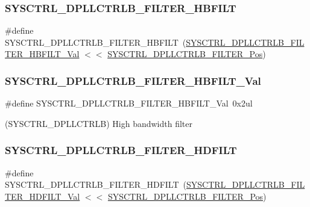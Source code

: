 \subsubsection{\texorpdfstring{SYSCTRL\_DPLLCTRLB\_FILTER\_HBFILT}{SYSCTRL\_DPLLCTRLB\_FILTER\_HBFILT}}
{\footnotesize\ttfamily \#define S\+Y\+S\+C\+T\+R\+L\+\_\+\+D\+P\+L\+L\+C\+T\+R\+L\+B\+\_\+\+F\+I\+L\+T\+E\+R\+\_\+\+H\+B\+F\+I\+LT~(\mbox{\hyperlink{group___s_a_m_d21___s_y_s_c_t_r_l_ga2bf8af18398ded60a70d51412c5aa84b}{S\+Y\+S\+C\+T\+R\+L\+\_\+\+D\+P\+L\+L\+C\+T\+R\+L\+B\+\_\+\+F\+I\+L\+T\+E\+R\+\_\+\+H\+B\+F\+I\+L\+T\+\_\+\+Val}} $<$$<$ \mbox{\hyperlink{group___s_a_m_d21___s_y_s_c_t_r_l_gaa22fec5574437cb05ff39861cd58e101}{S\+Y\+S\+C\+T\+R\+L\+\_\+\+D\+P\+L\+L\+C\+T\+R\+L\+B\+\_\+\+F\+I\+L\+T\+E\+R\+\_\+\+Pos}})}

\mbox{\label{group___s_a_m_d21___s_y_s_c_t_r_l_ga2bf8af18398ded60a70d51412c5aa84b}} 
\subsubsection{\texorpdfstring{SYSCTRL\_DPLLCTRLB\_FILTER\_HBFILT\_Val}{SYSCTRL\_DPLLCTRLB\_FILTER\_HBFILT\_Val}}
{\footnotesize\ttfamily \#define S\+Y\+S\+C\+T\+R\+L\+\_\+\+D\+P\+L\+L\+C\+T\+R\+L\+B\+\_\+\+F\+I\+L\+T\+E\+R\+\_\+\+H\+B\+F\+I\+L\+T\+\_\+\+Val~0x2ul}



(S\+Y\+S\+C\+T\+R\+L\+\_\+\+D\+P\+L\+L\+C\+T\+R\+LB) High bandwidth filter 

\mbox{\label{group___s_a_m_d21___s_y_s_c_t_r_l_ga6e0af7e79b2e2cd2f5b02794790ce5ea}} 
\subsubsection{\texorpdfstring{SYSCTRL\_DPLLCTRLB\_FILTER\_HDFILT}{SYSCTRL\_DPLLCTRLB\_FILTER\_HDFILT}}
{\footnotesize\ttfamily \#define S\+Y\+S\+C\+T\+R\+L\+\_\+\+D\+P\+L\+L\+C\+T\+R\+L\+B\+\_\+\+F\+I\+L\+T\+E\+R\+\_\+\+H\+D\+F\+I\+LT~(\mbox{\hyperlink{group___s_a_m_d21___s_y_s_c_t_r_l_ga3be3767f57ed52236435070848af34bf}{S\+Y\+S\+C\+T\+R\+L\+\_\+\+D\+P\+L\+L\+C\+T\+R\+L\+B\+\_\+\+F\+I\+L\+T\+E\+R\+\_\+\+H\+D\+F\+I\+L\+T\+\_\+\+Val}} $<$$<$ \mbox{\hyperlink{group___s_a_m_d21___s_y_s_c_t_r_l_gaa22fec5574437cb05ff39861cd58e101}{S\+Y\+S\+C\+T\+R\+L\+\_\+\+D\+P\+L\+L\+C\+T\+R\+L\+B\+\_\+\+F\+I\+L\+T\+E\+R\+\_\+\+Pos}})}

